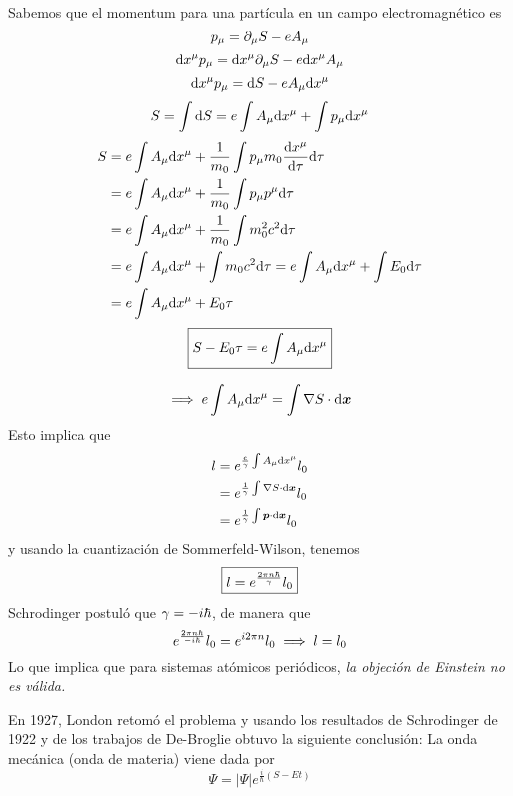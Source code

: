 Sabemos que el momentum para una partícula en un campo electromagnético es
\begin{equation}
  p_\mu =\partial_\mu S-e A_\mu 
\end{equation}
\begin{equation}
  \dd x^\mu p_\mu =\dd x^\mu \partial_\mu S-e\dd x^\mu A_\mu 
\end{equation}
\begin{equation}
  \dd x^\mu p_\mu =\dd S-eA_\mu \dd x^\mu 
\end{equation}
\begin{equation}
  S=\int\dd S=e\int A_\mu \dd x^\mu +\int p_\mu \dd x^\mu 
\end{equation}
\begin{align}
  S&=e\int A_\mu \dd x^\mu +\frac{1}{m_0 }\int p_\mu m_0\dv{x^\mu}{\tau}\dd\tau \\
  &=e\int A_\mu \dd x^\mu +\frac{1}{m_0}\int p_\mu p^\mu \dd\tau \\
  &=e\int A_\mu \dd x^\mu +\frac{1}{m_0 }\int m_0^2c^2\dd\tau \\
  &=e\int A_\mu \dd x^\mu +\int m_0c^2\dd \tau =e\int A_\mu \dd x^\mu +\int E_0\dd\tau \\
  &=e\int A_\mu \dd x^\mu + E_0\tau  
\end{align}
\begin{equation}
\boxed{  S-E_0\tau =e\int A_\mu \dd x^\mu }
\end{equation}

\begin{equation}
  \implies e\int A_\mu \dd x^\mu =\int\nabla S\cdot\dd\vb*{x}
\end{equation}
Esto implica que
\begin{align}
  l&=e^{\frac{e}{\gamma }\int A_\mu\dd x^\mu }l_0\\
  &=e^{\frac{1}{\gamma }\int\nabla S\cdot \dd\vb*{x}}l_0\\
  &=e^{\frac{1}{\gamma }\int\vb*{p}\cdot\dd\vb*{x}}l_0
\end{align}
y usando la cuantización de Sommerfeld-Wilson, tenemos
\begin{equation}
\boxed{  l=e^{\frac{2\pi n\hbar}{\gamma }}l_0}
\end{equation}
Schrodinger postuló que $\gamma=-i\hbar$, de manera que
\begin{equation}
  e^{\frac{2\pi n\hbar }{-i\hbar}}l_0=e^{i2\pi n}l_0\implies l=l_0
\end{equation}
Lo que implica que para sistemas atómicos periódicos, \textit{la objeción de Einstein no es válida.}

En 1927, London retomó el problema y usando los resultados de Schrodinger de 1922 y de los trabajos de De-Broglie obtuvo la siguiente conclusión: La onda mecánica (onda de materia) viene dada por 
\begin{equation}
  \Psi =|\Psi |e^{\frac{i}{\hbar}(S-Et)}
\end{equation}

